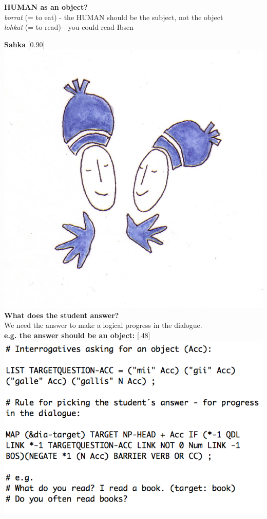 \documentclass[landscape,norsk,11pt]{seminar}
\begin{document}
\begin{slide}
\newslide
\textbf{HUMAN as an object?} \\
 \textit{borrat} (= to eat) - the HUMAN should be the subject, not the object \\
  \textit{lohkat} (= to read) - you could read Ibsen

\newslide
\textbf{Sahka}
\scalebox{0.90}[0.90]{\includegraphics{img/sahka.png}} \\

\newslide
\textbf{What does the student answer?}\\
We need the answer to make a logical progress in the dialogue. \\
\newslide
\textbf{e.g. the answer should be an object:}
\scalebox{.48}[.48]{\includegraphics{img/pickingObject.png}}



\end{slide}
\end{document}
